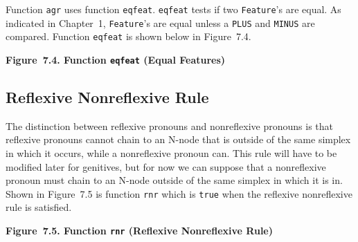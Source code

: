 \documentclass{article}
\begin{document}
Function \texttt{agr} uses function
\texttt{eqfeat}. \texttt{eqfeat} tests if two \texttt{Feature}'s
are equal. As indicated in Chapter~1, \texttt{Feature}'s are
equal unless a \texttt{PLUS} and \texttt{MINUS} are
compared. Function \texttt{eqfeat} is shown below in Figure~7.4.

\bigbreak
\begin{minipage}{\textwidth}
\vbox{}
\bigbreak
{}
\textbf{Figure~7.4. Function \texttt{eqfeat} (Equal Features)}
\end{minipage}
\bigbreak


\subsection{Reflexive Nonreflexive Rule}

The distinction between reflexive pronouns and nonreflexive
pronouns is that reflexive pronouns cannot chain to an N-node
that is outside of the same simplex in which it occurs, while a
nonreflexive pronoun can. This rule will have to be modified
later for genitives, but for now we can suppose that a
nonreflexive pronoun must chain to an N-node outside of the same
simplex in which it is in. Shown in Figure~7.5 is function
\texttt{rnr} which is \texttt{true} when the reflexive
nonreflexive rule is satisfied.

\bigbreak
\begin{minipage}{\textwidth}
\vbox{}
\bigbreak
{}
\textbf{Figure~7.5. Function \texttt{rnr} (Reflexive Nonreflexive Rule)}
\end{minipage}
\bigbreak
\end{document}
